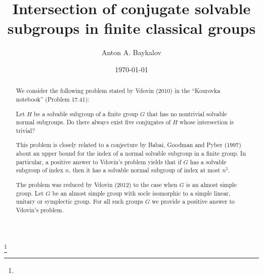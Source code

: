 \documentclass{memo-l}
\theoremstyle{definition}
\theoremstyle{remark}
\numberwithin{section}{chapter}
\numberwithin{equation}{chapter}
\begin{document}
\frontmatter

\title{Intersection of conjugate solvable subgroups in finite classical groups}


\author{Anton A. Baykalov}
\address{The University of Auckland, Auckland, New Zealand}
\curraddr{}
\thanks{}


\date{\today}




\begin{abstract}
 We consider the following problem stated by Vdovin (2010) in the ``Kourovka notebook''  (Problem 17.41):

\medskip

Let $H$ be a solvable subgroup of a finite group $G$ that has no nontrivial solvable
normal subgroups.
 Do there always exist five conjugates of $H$ whose intersection is trivial?

\medskip

This problem is closely related to a conjecture by Babai, Goodman and Pyber (1997) about an upper bound for the index of a normal solvable subgroup in a finite group. In particular, a positive answer to Vdovin's problem yields that  if $G$ has a solvable subgroup of index $n$, then it has a solvable normal subgroup of index at most $n^5$.

The problem was reduced by Vdovin (2012) to the case when $G$ is an almost simple group.  Let $G$ be an almost simple group with  socle isomorphic to a simple linear, unitary or symplectic group. For all such groups $G$ we provide a positive answer to Vdovin's  problem.
\end{abstract}

\maketitle

\tableofcontents




\mainmatter





%

\backmatter
%


\printindex
\end{document}
